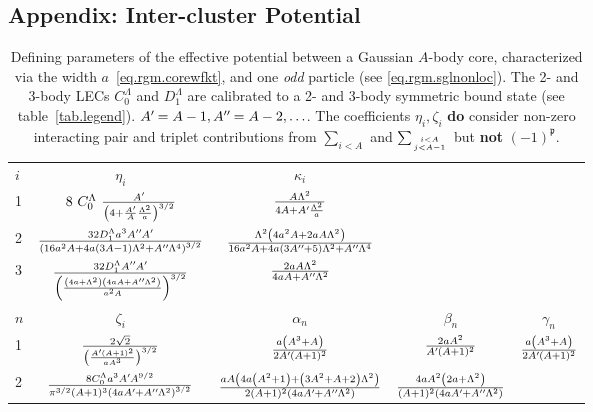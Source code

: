 \documentclass
[aps,nofootinbib,prl,showpacs,twocolumn,groupedaddress,superscriptaddress]
{revtex4}
\newcommand*{\mprime}{^{\prime}\mkern-1.2mu}
\newcommand*{\mdprime}{^{\prime\prime}\mkern-1.2mu}
\begin{document}
\begin{widetext}
\begin{turnpage}
\section{Appendix: Inter-cluster Potential}
\begin{table}
\setlength{\tabcolsep}{4pt}
\renewcommand{\arraystretch}{2.4}
\caption{\label{tab.rgmpot}{Defining parameters of the effective potential between
a Gaussian $A$-body core, characterized via the width $a$~\eqref{eq.rgm.corewfkt},
and one {\it odd} particle (see \eqref{eq.rgm.sglnonloc}).
The 2- and 3-body LECs $C^\Lambda_0$ and $D^\Lambda_1$ are
calibrated to a 2- and 3-body symmetric bound state (see table~\ref{tab.legend}).
$A\mprime=A-1, A\mdprime=A-2, \ldots$. The coefficients $\eta_i,\zeta_i$ {\bf do}
consider non-zero interacting pair and triplet contributions from $\sum_{i<A}$ and
$\sum_{i<A\atop j<A-1}$ but {\bf not} $(-1)^{\mathfrak{p}}$.}}
\small\centering
\begin{tabular}{lc|ccc}
\hline\hline
$i$ & $\eta_i$ & $\kappa_i$ & & \\
1   & $8~C_0^\Lambda~\frac{A\mprime}{\left(4+\frac{A\mprime}{A}\frac{\Lambda^2}{a}\right)^{3/2}}$  & $\frac{A\Lambda^2}{4A+A\mprime\frac{\Lambda^2}{a}}$ \\
2   & $
\frac{32 D_1^\Lambda a^3 A\mdprime A\mprime}{\left(16 a^2 A+4 a (3 A-1) \Lambda ^2+A\mdprime \Lambda ^4\right)^{3/2}}$ & $\frac{\Lambda ^2 \left(4 a^2 A+2 a A \Lambda ^2\right)}{16 a^2 A+4 a (3 A\mdprime+5) \Lambda ^2+A\mdprime \Lambda ^4}$ \\
3 & 
$\frac{32 D_1^\Lambda A\mdprime A\mprime}{\left(\frac{\left(4 a+\Lambda ^2\right) \left(4 a A+A\mdprime \Lambda ^2\right)}{a^2 A}\right)^{3/2}}$ & $\frac{2 a A \Lambda ^2}{4 a A+A\mdprime \Lambda ^2}$ \\
\hline
$n$ & $\zeta_i$ & $\alpha_n$ & $\beta_n$ & $\gamma_n$ \\
1 &$\frac{2 \sqrt{2}}{\left(\frac{A\mprime (A+1)^2}{a A^3}\right)^{3/2}}$&
$\frac{a \left(A^3+A\right)}{2 A\mprime (A+1)^2}$&
$\frac{2 a A^2}{A\mprime (A+1)^2}$&
$\frac{a \left(A^3+A\right)}{2 A\mprime (A+1)^2}$\\
2 & 
$ \frac{8 C_0^\Lambda a^3 A\mprime A^{9/2}}{\pi ^{3/2} (A+1)^3 \left(4 a A\mprime+A\mdprime \Lambda ^2\right)^{3/2}}  $ & 
$\frac{\text{} a A \left(4 a \left(A^2+1\right)+\left(3 A^2+A+2\right) \Lambda ^2\right)}{2 (A+1)^2 \left(4 a A\mprime+A\mdprime \Lambda ^2\right)}$&
$\frac{4 \text{} a A^2 \left(2 a+\Lambda ^2\right)}{(A+1)^2 \left(4 a A\mprime+A\mdprime \Lambda ^2\right)}$&

\end{tabular}
\end{table}
\end{turnpage}
\end{widetext}
\end{document}
